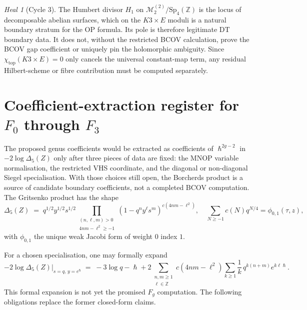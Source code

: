 \documentclass[11pt]{article}
\theoremstyle{plain}
\theoremstyle{definition}
\theoremstyle{remark}
\newtheorem{heal}[theorem]{Heal}
\providecommand{\Z}{\mathbb{Z}}
\providecommand{\cM}{\mathcal{M}}
\providecommand{\hbar}{\hslash}
\begin{document}
\begin{heal}[Cycle 3]
The Humbert divisor $H_1$ on $\cM_2^{(2)}/\mathrm{Sp}_4(\Z)$ is the
locus of decomposable abelian surfaces, which on the $K3\times E$
moduli is a natural boundary stratum for the OP formula. Its pole is
therefore legitimate DT boundary data. It does not, without the
restricted BCOV calculation, prove the BCOV gap coefficient or uniquely
pin the holomorphic ambiguity. Since $\chi_{\mathrm{top}}(K3\times E)=0$
only cancels the universal constant-map term, any residual Hilbert-scheme
or fibre contribution must be computed separately.
\end{heal}

\section{Coefficient-extraction register for $F_0$ through $F_3$}
\label{sec:explicit}

The proposed genus coefficients would be extracted as coefficients of
$\hbar^{2g-2}$ in $-2\log\Delta_5(Z)$ only after three pieces of data
are fixed: the MNOP variable normalisation, the restricted VHS
coordinate, and the diagonal or non-diagonal Siegel specialisation.
With those choices still open, the Borcherds product is a source of
candidate boundary coefficients, not a completed BCOV computation. The
Gritsenko \cite{Gritsenko1995, GritsenkoNikulin1998} product has the
shape
\[
\Delta_5(Z) \;=\; q^{1/2}y^{1/2}s^{1/2}\!\!
\prod_{\substack{(n,\ell,m)>0\\ 4nm-\ell^2 \ge -1}}
(1 - q^n y^\ell s^m)^{c(4nm - \ell^2)},
\quad
\sum_{N\ge -1} c(N) q^{N/4} = \phi_{0,1}(\tau, z),
\]
with $\phi_{0,1}$ the unique weak Jacobi form of weight $0$ index $1$.

For a chosen specialisation, one may formally expand
\[
-2\log\Delta_5(Z)\bigr|_{s=q,\,y=e^\hbar}
\;=\; -3\log q - \hbar
+ 2\!\!\!\sum_{\substack{n,m\ge 1\\ \ell\in\Z}}\!
c(4nm-\ell^2)\sum_{k\ge 1}\frac{1}{k}\, q^{k(n+m)} e^{k\ell\hbar}.
\]
This formal expansion is not yet the promised $F_g$ computation. The
following obligations replace the former closed-form claims.
\end{document}
